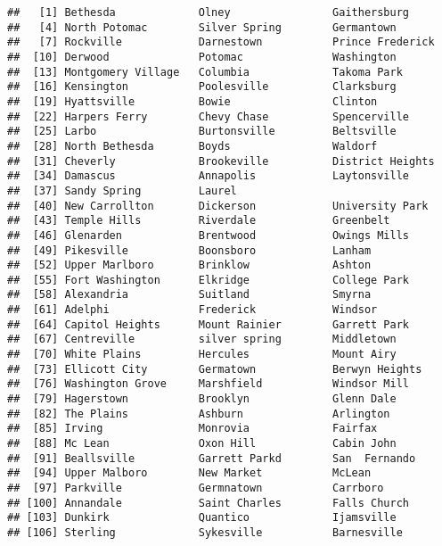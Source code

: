 \documentclass[]{article}
\begin{document}
\begin{verbatim}
##   [1] Bethesda             Olney                Gaithersburg        
##   [4] North Potomac        Silver Spring        Germantown          
##   [7] Rockville            Darnestown           Prince Frederick    
##  [10] Derwood              Potomac              Washington          
##  [13] Montgomery Village   Columbia             Takoma Park         
##  [16] Kensington           Poolesville          Clarksburg          
##  [19] Hyattsville          Bowie                Clinton             
##  [22] Harpers Ferry        Chevy Chase          Spencerville        
##  [25] Larbo                Burtonsville         Beltsville          
##  [28] North Bethesda       Boyds                Waldorf             
##  [31] Cheverly             Brookeville          District Heights    
##  [34] Damascus             Annapolis            Laytonsville        
##  [37] Sandy Spring         Laurel                                   
##  [40] New Carrollton       Dickerson            University Park     
##  [43] Temple Hills         Riverdale            Greenbelt           
##  [46] Glenarden            Brentwood            Owings Mills        
##  [49] Pikesville           Boonsboro            Lanham              
##  [52] Upper Marlboro       Brinklow             Ashton              
##  [55] Fort Washington      Elkridge             College Park        
##  [58] Alexandria           Suitland             Smyrna              
##  [61] Adelphi              Frederick            Windsor             
##  [64] Capitol Heights      Mount Rainier        Garrett Park        
##  [67] Centreville          silver spring        Middletown          
##  [70] White Plains         Hercules             Mount Airy          
##  [73] Ellicott City        Germatown            Berwyn Heights      
##  [76] Washington Grove     Marshfield           Windsor Mill        
##  [79] Hagerstown           Brooklyn             Glenn Dale          
##  [82] The Plains           Ashburn              Arlington           
##  [85] Irving               Monrovia             Fairfax             
##  [88] Mc Lean              Oxon Hill            Cabin John          
##  [91] Beallsville          Garrett Parkd        San  Fernando       
##  [94] Upper Malboro        New Market           McLean              
##  [97] Parkville            Germnatown           Carrboro            
## [100] Annandale            Saint Charles        Falls Church        
## [103] Dunkirk              Quantico             Ijamsville          
## [106] Sterling             Sykesville           Barnesville         

\end{verbatim}
\end{document}
